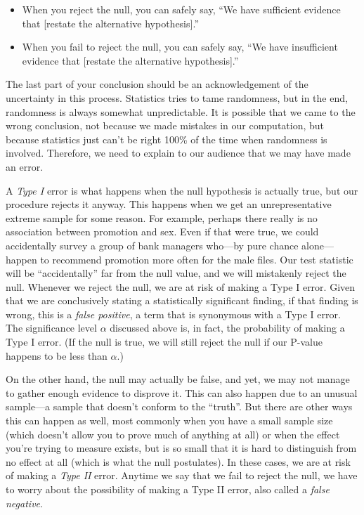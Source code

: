 \documentclass[
]{book}
\providecommand{\tightlist}{%
  \setlength{\itemsep}{0pt}\setlength{\parskip}{0pt}}
\begin{document}
\begin{itemize}
\tightlist
\item
  When you reject the null, you can safely say, ``We have sufficient evidence that {[}restate the alternative hypothesis{]}.''
\item
  When you fail to reject the null, you can safely say, ``We have insufficient evidence that {[}restate the alternative hypothesis{]}.''
\end{itemize}

The last part of your conclusion should be an acknowledgement of the uncertainty in this process. Statistics tries to tame randomness, but in the end, randomness is always somewhat unpredictable. It is possible that we came to the wrong conclusion, not because we made mistakes in our computation, but because statistics just can't be right 100\% of the time when randomness is involved. Therefore, we need to explain to our audience that we may have made an error.

A \emph{Type I} error is what happens when the null hypothesis is actually true, but our procedure rejects it anyway. This happens when we get an unrepresentative extreme sample for some reason. For example, perhaps there really is no association between promotion and sex. Even if that were true, we could accidentally survey a group of bank managers who---by pure chance alone---happen to recommend promotion more often for the male files. Our test statistic will be ``accidentally'' far from the null value, and we will mistakenly reject the null. Whenever we reject the null, we are at risk of making a Type I error. Given that we are conclusively stating a statistically significant finding, if that finding is wrong, this is a \emph{false positive}, a term that is synonymous with a Type I error. The significance level \(\alpha\) discussed above is, in fact, the probability of making a Type I error. (If the null is true, we will still reject the null if our P-value happens to be less than \(\alpha\).)

On the other hand, the null may actually be false, and yet, we may not manage to gather enough evidence to disprove it. This can also happen due to an unusual sample---a sample that doesn't conform to the ``truth''. But there are other ways this can happen as well, most commonly when you have a small sample size (which doesn't allow you to prove much of anything at all) or when the effect you're trying to measure exists, but is so small that it is hard to distinguish from no effect at all (which is what the null postulates). In these cases, we are at risk of making a \emph{Type II} error. Anytime we say that we fail to reject the null, we have to worry about the possibility of making a Type II error, also called a \emph{false negative}.
\end{document}

